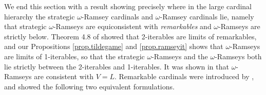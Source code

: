 \documentclass[../main]{subfiles}
\begin{document}
\qquad We end this section with a result showing precisely where in the large cardinal hierarchy the strategic $\omega$-Ramsey cardinals and $\omega$-Ramsey cardinals lie, namely that strategic $\omega$-Ramseys are equiconsistent with \textit{remarkables} and $\omega$-Ramseys are strictly below. Theorem 4.8 of \cite{Ramsey2} showed that 2-iterables are limits of remarkables, and our Propositions \ref{prop.tildegame} and \ref{prop.ramseyit} shows that $\omega$-Ramseys are limits of 1-iterables, so that the strategic $\omega$-Ramseys and the $\omega$-Ramseys both lie strictly between the 2-iterables and 1-iterables. It was shown in \cite{HolySchlicht} that $\omega$-Ramseys are consistent with $V=L$. Remarkable cardinals were introduced by \cite{remarkable}, and \cite{GitmanSchindler} showed the following two equivalent formulations.

\end{document}
